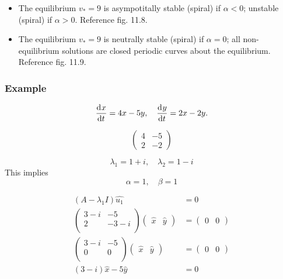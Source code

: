 \documentclass[12pt]{article}
\begin{document}
\begin{itemize}
\item The equilibrium $v_*=9$ is asympotitally stable (spiral) if $\alpha<0$;
  unstable (spiral) if $\alpha>0$. Reference fig. 11.8.
\item The equilibrium $v_*=9$ is neutrally stable (spiral) if $\alpha=0$; all
  non-equilibrium solutions are closed periodic curves about the equilibrium.
  Reference fig. 11.9.
\end{itemize}

\subsubsection{Example}
\begin{equation}
  \frac{\mathrm{d}^{} {x}}{\mathrm{d}{t}^{}} = 4x-5y,\quad \frac{\mathrm{d}^{} {y}}{\mathrm{d}{t}^{}}=2x-2y.
\end{equation}

\begin{equation}
  \begin{pmatrix}
    4 & -5 \\ 2 & -2
  \end{pmatrix}
\end{equation}

\begin{equation}
  \lambda_1=1+i,\quad \lambda_2=1-i
\end{equation}
This implies
\begin{equation}
  \alpha=1,\quad \beta=1
\end{equation}

\begin{equation}
  \begin{aligned}
    (A-\lambda_1I)\hat{u_1} &= 0 \\
    \begin{pmatrix}
      3-i & -5 \\ 2 & -3-i \\
    \end{pmatrix}
    \begin{pmatrix}
      \hat{x} & \hat{y}
    \end{pmatrix} &=
    \begin{pmatrix}
      0 & 0
    \end{pmatrix} \\
    \begin{pmatrix}
      3-i & -5 \\ 0 & 0 \\
    \end{pmatrix}
    \begin{pmatrix}
      \hat{x} & \hat{y}
    \end{pmatrix} &=
    \begin{pmatrix}
      0 & 0
    \end{pmatrix} \\
    (3-i)\hat{x}-5\hat{y}&=0 \\
  \end{aligned}
\end{equation}
\end{document}
